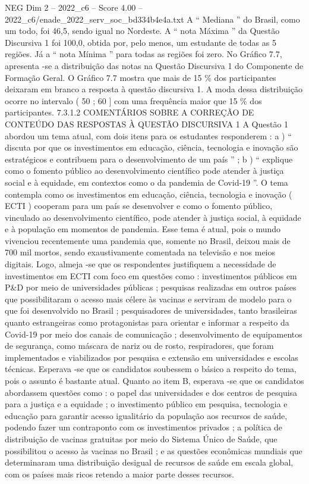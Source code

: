 \begin{textsample}{NEG Dim 2 – 2022\_c6 – Score 4.00 – 2022\_c6/enade\_2022\_serv\_soc\_bd334b4e4a.txt}
A “ Mediana ” do Brasil, como um todo, foi 46,5, sendo igual no Nordeste.
A “ nota Máxima ” da Questão Discursiva 1 foi 100,0, obtida por, pelo menos, um estudante de todas as 5 regiões.
Já a “ nota Mínima ” para todas as regiões foi zero.
No Gráfico 7.7, apresenta -se a distribuição das notas na Questão Discursiva 1 do Componente de Formação Geral.
O Gráfico 7.7 mostra que mais de 15 \% dos participantes deixaram em branco a resposta à questão discursiva 1.
A moda dessa distribuição ocorre no intervalo ( 50 ; 60 ] com uma frequência maior que 15 \% dos participantes. 7.3.1.2 COMENTÁRIOS SOBRE A CORREÇÃO DE CONTEÚDO DAS RESPOSTAS À QUESTÃO DISCURSIVA 1 A Questão 1 abordou um tema atual, com dois itens para os estudantes responderem : a ) “ discuta por que os investimentos em educação, ciência, tecnologia e inovação são estratégicos e contribuem para o desenvolvimento de um país ” ; b ) “ explique como o fomento público ao desenvolvimento científico pode atender à justiça social e à equidade, em contextos como o da pandemia de Covid-19 ”.
O tema contempla como os investimentos em educação, ciência, tecnologia e inovação ( ECTI ) cooperam para um país se desenvolver e como o fomento público, vinculado ao desenvolvimento científico, pode atender à justiça social, à equidade e à população em momentos de pandemia.
Esse tema é atual, pois o mundo vivenciou recentemente uma pandemia que, somente no Brasil, deixou mais de 700 mil mortos, sendo exaustivamente comentada na televisão e nos meios digitais.
Logo, almeja -se que os respondentes justifiquem a necessidade de investimentos em ECTI com foco em questões como : investimentos públicos em P\&D por meio de universidades públicas ; pesquisas realizadas em outros países que possibilitaram o acesso mais célere às vacinas e serviram de modelo para o que foi desenvolvido no Brasil ; pesquisadores de universidades, tanto brasileiras quanto estrangeiras como protagonistas para orientar e informar a respeito da Covid-19 por meio dos canais de comunicação ; desenvolvimento de equipamentos de segurança, como máscara de nariz ou de rosto, respiradores, que foram implementados e viabilizados por pesquisa e extensão em universidades e escolas técnicas.
Esperava -se que os candidatos soubessem o básico a respeito do tema, pois o assunto é bastante atual.
Quanto ao item B, esperava -se que os candidatos abordassem questões como : o papel das universidades e dos centros de pesquisa para a justiça e a equidade ; o investimento público em pesquisa, tecnologia e educação para garantir acesso igualitário da população aos recursos de saúde, podendo fazer um contraponto com os investimentos privados ; a política de distribuição de vacinas gratuitas por meio do Sistema Único de Saúde, que possibilitou o acesso às vacinas no Brasil ; e as questões econômicas mundiais que determinaram uma distribuição desigual de recursos de saúde em escala global, com os países mais ricos retendo a maior parte desses recursos.

\end{textsample}

